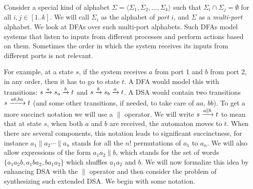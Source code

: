 \label{sec:multi-port-inputs}%


Consider a special kind of alphabet
$\Sigma = \langle \Sigma_1, \Sigma_2, \dots, \Sigma_k \rangle$ such
that $\Sigma_i \cap \Sigma_j = \emptyset$ for all $i, j \in
[1..k]$. We will call $\Sigma_i$ as the alphabet of \emph{port} $i$,
and $\Sigma$ as a \emph{multi-port} alphabet. We
look at DFAs over such multi-port alphabets. Such DFAs model systems
that listen to inputs from different processes and perform actions
based on them. Sometimes the order in which the system receives its
inputs from different ports is not relevant.%
  
For example, at a state
$s$, if the system receives $a$ from port 1 and $b$ from port 2, in any
order, then it has to go to state $t$.  A DFA would model this with
transitions: $s \xrightarrow{a} s_a \xrightarrow{b} t$ and $s \xrightarrow{b} s_b \xrightarrow{a}
t$. A DSA would contain two transitions $s \xrightarrow{ab, ba} t$ (and some
other transitions, if needed, to take care of $aa$, $bb$). To get a
more succinct notation we will use a $\parallel$ operator. We will
write $s \xrightarrow{a \parallel b} t$ to mean that at state $s$, when
both $a$ and $b$ are received, the automaton moves to $t$. When there
are several components, this notation leads to significant
succinctness, for instance $a_1 \parallel a_2 \cdots \parallel a_n$
stands for all the $n!$ permutations of $a_1$ to $a_n$. We will also
allow expressions of the form $a_1 a_2 \parallel b$, which stands for
the set of words $\{a_1 a_2 b, a_1 b a_2, b a_1 a_2\}$ which shuffles
$a_1a_2$ and $b$. We will now formalize this idea by enhancing DSA with
the $\parallel$ operator and then consider the problem of synthesizing
such extended DSA. We begin with some notation.%




